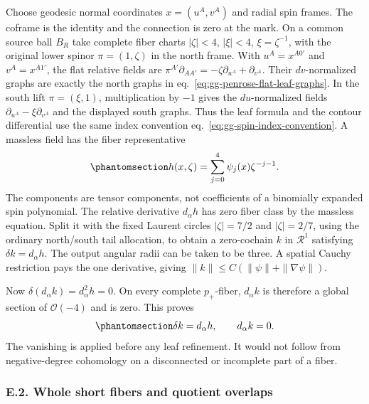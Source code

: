 \documentclass[
  english,
  11pt,
  reqno]{amsart}
\begin{document}
Choose geodesic normal coordinates \(x=(u^A,v^A)\) and radial spin
frames. The coframe is the identity and the connection is zero at the
mark. On a common source ball \(B_R\) take complete fiber charts
\(|\zeta|<4\), \(|\xi|<4\), \(\xi=\zeta^{-1}\), with the original lower
spinor \(\pi=(1,\zeta)\) in the north frame. With \(u^A=x^{A0'}\) and
\(v^A=x^{A1'}\), the flat relative fields are
\(\pi^{A'}\partial_{AA'}=-\zeta\partial_{u^A}+\partial_{v^A}\). Their
\(dv\)-normalized graphs are exactly the north graphs in
eq.~\ref{eq:gg-penrose-flat-leaf-graphs}. In the south lift
\(\pi=(\xi,1)\), multiplication by \(-1\) gives the \(du\)-normalized
fields \(\partial_{u^A}-\xi\partial_{v^A}\) and the displayed south
graphs. Thus the leaf formula and the contour differential use the same
index convention eq.~\ref{eq:gg-spin-index-convention}. A massless field
has the fiber representative
\begin{equation}\protect\phantomsection\label{eq:gg-penrose-five-term-lift}{
 h(x,\zeta)=\sum_{j=0}^4\psi_j(x)\zeta^{-j-1}.
}\end{equation} The components are tensor components, not coefficients
of a binomially expanded spin polynomial. The relative derivative
\(d_\alpha h\) has zero fiber class by the massless equation. Split it
with the fixed Laurent circles \(|\zeta|=7/2\) and \(|\zeta|=2/7\),
using the ordinary north/south tail allocation, to obtain a zero-cochain
\(k\) in \(\mathcal R^1\) satisfying \(\delta k=d_\alpha h\). The output
angular radii can be taken to be three. A spatial Cauchy restriction
pays the one derivative, giving \(\|k\|\le C(\|\psi\|+\|\nabla\psi\|)\).

Now \(\delta(d_\alpha k)=d_\alpha^2h=0\). On every complete
\(p_+\)-fiber, \(d_\alpha k\) is therefore a global section of
\(\mathcal O(-4)\) and is zero. This proves
\begin{equation}\protect\phantomsection\label{eq:gg-penrose-complete-fiber-identities}{
 \delta k=d_\alpha h,\qquad d_\alpha k=0 .
}\end{equation} The vanishing is applied before any leaf refinement. It
would not follow from negative-degree cohomology on a disconnected or
incomplete part of a fiber.

\protect{}\label{sec:gg-penrose-whole-leaf-domains}

\subsubsection{E.2. Whole short fibers and quotient
overlaps}\label{e.2.-whole-short-fibers-and-actual-quotient-overlaps}
\end{document}
